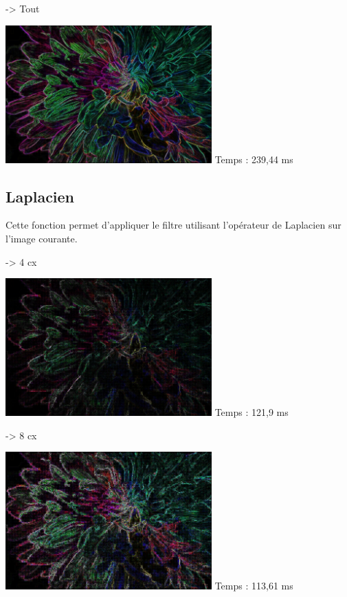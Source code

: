 \documentclass{article}
\begin{document}
-> Tout
\begin{center}
    \medbreak
    \includegraphics[width=300px]{./Images/Multicolor/Sobel_All.jpg}
    \bigbreak
    Temps  : 239,44 ms
\end{center}
\bigbreak

\subsection{Laplacien}
Cette fonction permet d'appliquer le filtre utilisant l'opérateur de Laplacien sur l'image courante.
\medbreak

-> 4 cx
\begin{center}
    \medbreak
    \includegraphics[width=300px]{./Images/Multicolor/Laplacian_4.jpg}
    \bigbreak
    Temps  : 121,9 ms
\end{center}
\medbreak

-> 8 cx
\begin{center}
    \medbreak
    \includegraphics[width=300px]{./Images/Multicolor/Laplacian_8.jpg}
    \bigbreak
    Temps  : 113,61 ms
\end{center}
\medbreak
\end{document}
